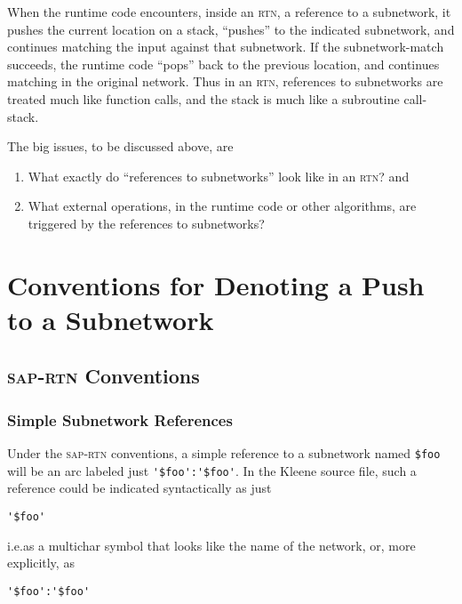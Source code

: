 \documentclass[letterpaper,12pt]{article}
\providecommand{\acro}{}\renewcommand{\acro}{\textsc}
\begin{document}
When the runtime code encounters, inside an \acro{rtn}, a reference to a subnetwork,
it pushes the current location on a stack, ``pushes'' to the indicated
subnetwork, and continues matching the input against that subnetwork.  If the
subnetwork-match succeeds, the runtime code ``pops'' back to the
previous location, and continues matching in the original network.  Thus in an \acro{rtn},
references to subnetworks are treated much like function calls, and the stack is much
like a subroutine call-stack.

The big issues, to be discussed above, are

\begin{enumerate}
\item
What exactly do ``references to subnetworks'' look like in an \acro{rtn}? and

\item
What external operations, in the runtime code or other algorithms, are triggered by
the references to subnetworks?

\end{enumerate}

\section{Conventions for Denoting a Push to a Subnetwork}

\subsection{\acro{sap-rtn} Conventions}

\subsubsection{Simple Subnetwork References}

Under the \acro{sap-rtn} conventions, a simple reference to a subnetwork named \verb!$foo! will be an arc labeled just
\verb!'$foo':'$foo'!.  In the Kleene source file, such a reference could be
indicated syntactically as just

\begin{Verbatim}[fontsize=\small]
'$foo'
\end{Verbatim}

\noindent
i.e.\@ as a multichar symbol that looks like the name of the network, or, more explicitly, as

\begin{Verbatim}[fontsize=\small]
'$foo':'$foo'
\end{Verbatim}
\end{document}
